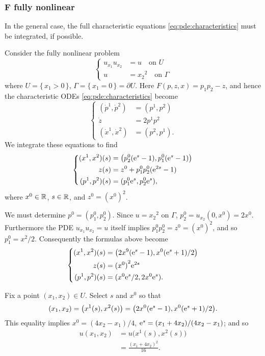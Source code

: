 \subsubsection[\(F\) fully nonlinear]{\(\boldsymbol F\) fully nonlinear}
In the general case, the full characteristic equations
\eqref{eq:pde:characteristics} must be integrated, if possible.
\begin{example}
  Consider the fully nonlinear problem
  \begin{equation}
    \label{eq:pde:nonlinear-ex-3}
    \left\{
    \begin{aligned}
      u_{x_1}u_{x_2}&=u\quad\text{on \(U\)}\\
      u&={x_2}^2\quad\text{on \(\Gamma\)}
    \end{aligned}
    \right.
  \end{equation}
  where \(U=\{\,x_1>0\,\}\), \(\Gamma=\{\,x_1=0\,\}=\partial U\). Here
  \(F(p,z,x)=p_1p_2-z\), and hence the characteristic ODEs
  \eqref{eq:pde:characteristics} become
  \[
    \left\{
    \begin{aligned}
      (\dot p^1,\dot p^2)&=(p^1,p^2)\\
      \dot z&=2p^1p^2\\
      (\dot x^1,\dot x^2)&=(p^2,p^1).
    \end{aligned}
    \right.
  \]
  We integrate these equations to find
  \[
    \left\{
    \begin{aligned}
      (x^1,x^2)(s)&=\bigl(p_2^0(\mathrm{e}^s-1),p_1^0(\mathrm{e}^s-1)\bigr)\\
      z(s)&=z^0+p_1^0p_2^0(\mathrm{e}^{2s}-1)\\
      (p^1,p^2)(s)&=(p_1^0\mathrm{e}^s,p_2^0\mathrm{e}^s),
    \end{aligned}
    \right.
  \]
  where \(x^0\in\mathbb{R}\), \(s\in\mathbb{R}\), and \(z^0={(x^0)}^2\).

  We must determine \(p^0=(p_1^0,p_2^0)\). Since \(u={x_2}^2\) on
  \(\Gamma\), \(p_2^0=u_{x_2}(0,x^0)=2x^0\). Furthermore the PDE
  \(u_{x_1}u_{x_2}=u\) itself implies \(p_1^0p_2^0=z^0={(x^0)}^2\), and so
  \(p_1^0=x^2/2\). Consequently the formulas above become
  \[
    \left\{
      \begin{aligned}
        (x^1,x^2)(s)&=\bigl(2x^9(\mathrm{e}^s-1),x^0(\mathrm{e}^s+1)/2\bigr)\\
        z(s)&={(x^0)}^2\mathrm{e}^{2s}\\
        (p^1,p^2)(s)&=(x^0\mathrm{e}^s/2,2x^0\mathrm{e}^s).
      \end{aligned}
    \right.
  \]

  Fix a point \((x_1,x_2)\in U\). Select \(s\) and \(x^0\) so that
  \[
    (x_1,x_2)=\bigl( x^1(s),x^2(s) \bigr)=\bigl(
    2x^0(\mathrm{e}^s-1),x^0(\mathrm{e}^s+1)/2 \bigr).
  \]
  This equality implies \(x^0=(4x_2-x_1)/4\),
  \(\mathrm{e}^s=(x_1+4x_2)/(4x_2-x_1)\); and so
  \begin{align*}
    u(x_1,x_2)&=u\bigl( x^1(s),x^2(s) \bigr)\\
              &=\frac{(x_1+4x_2)^2}{16}.
  \end{align*}
\end{example}


